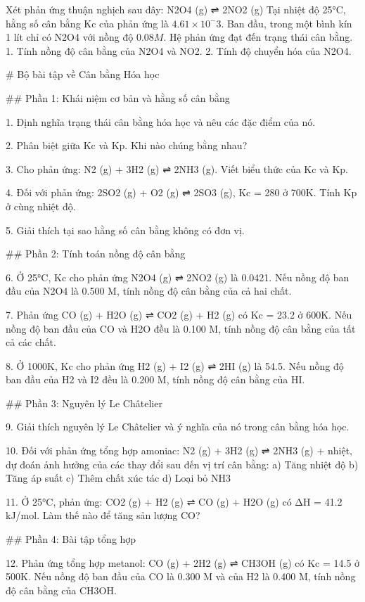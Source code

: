 Xét phản ứng thuận nghịch sau đây:
N2O4 (g) ⇌ 2NO2 (g)
Tại nhiệt độ 25°C, hằng số cân bằng Kc của phản ứng là $4.61 × 10^-3$. Ban đầu, trong một bình kín 1 lít chỉ có N2O4 với nồng độ $0.08 M$. Hệ phản ứng đạt đến trạng thái cân bằng.
1. Tính nồng độ cân bằng của N2O4 và NO2.
2. Tính độ chuyển hóa của N2O4.

# Bộ bài tập về Cân bằng Hóa học

## Phần 1: Khái niệm cơ bản và hằng số cân bằng

1. Định nghĩa trạng thái cân bằng hóa học và nêu các đặc điểm của nó.

2. Phân biệt giữa Kc và Kp. Khi nào chúng bằng nhau?

3. Cho phản ứng: N2 (g) + 3H2 (g) ⇌ 2NH3 (g). Viết biểu thức của Kc và Kp.

4. Đối với phản ứng: 2SO2 (g) + O2 (g) ⇌ 2SO3 (g), Kc = 280 ở 700K. Tính Kp ở cùng nhiệt độ.

5. Giải thích tại sao hằng số cân bằng không có đơn vị.

## Phần 2: Tính toán nồng độ cân bằng

6. Ở 25°C, Kc cho phản ứng N2O4 (g) ⇌ 2NO2 (g) là 0.0421. Nếu nồng độ ban đầu của N2O4 là 0.500 M, tính nồng độ cân bằng của cả hai chất.

7. Phản ứng CO (g) + H2O (g) ⇌ CO2 (g) + H2 (g) có Kc = 23.2 ở 600K. Nếu nồng độ ban đầu của CO và H2O đều là 0.100 M, tính nồng độ cân bằng của tất cả các chất.

8. Ở 1000K, Kc cho phản ứng H2 (g) + I2 (g) ⇌ 2HI (g) là 54.5. Nếu nồng độ ban đầu của H2 và I2 đều là 0.200 M, tính nồng độ cân bằng của HI.

## Phần 3: Nguyên lý Le Châtelier

9. Giải thích nguyên lý Le Châtelier và ý nghĩa của nó trong cân bằng hóa học.

10. Đối với phản ứng tổng hợp amoniac: N2 (g) + 3H2 (g) ⇌ 2NH3 (g) + nhiệt, dự đoán ảnh hưởng của các thay đổi sau đến vị trí cân bằng:
    a) Tăng nhiệt độ
    b) Tăng áp suất
    c) Thêm chất xúc tác
    d) Loại bỏ NH3

11. Ở 25°C, phản ứng: CO2 (g) + H2 (g) ⇌ CO (g) + H2O (g) có ΔH = 41.2 kJ/mol. Làm thế nào để tăng sản lượng CO?

## Phần 4: Bài tập tổng hợp

12. Phản ứng tổng hợp metanol: CO (g) + 2H2 (g) ⇌ CH3OH (g) có Kc = 14.5 ở 500K. Nếu nồng độ ban đầu của CO là 0.300 M và của H2 là 0.400 M, tính nồng độ cân bằng của CH3OH.


